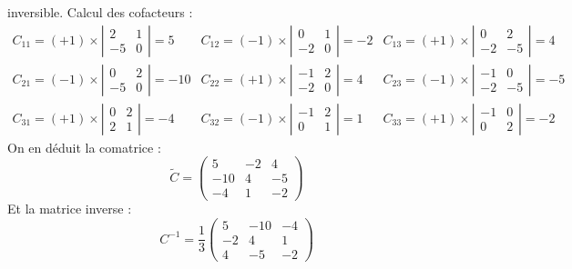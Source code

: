 {{inversible.
Calcul des cofacteurs :
$$
\begin{array}{lll}
	C_{11}=(+1) \times\left|\begin{array}{cc}
		2 & 1 \\
		-5 & 0
	\end{array}\right|=5 & C_{12}=(-1) \times\left|\begin{array}{cc}
		0 & 1 \\
		-2 & 0
	\end{array}\right|=-2 & C_{13}=(+1) \times\left|\begin{array}{cc}
		0 & 2 \\
		-2 & -5
	\end{array}\right|=4 \\
	C_{21}=(-1) \times\left|\begin{array}{cc}
		0 & 2 \\
		-5 & 0
	\end{array}\right|=-10 & C_{22}=(+1) \times\left|\begin{array}{cc}
		-1 & 2 \\
		-2 & 0
	\end{array}\right|=4 & C_{23}=(-1) \times\left|\begin{array}{cc}
		-1 & 0 \\
		-2 & -5
	\end{array}\right|=-5 \\
	C_{31}=(+1) \times\left|\begin{array}{cc}
		0 & 2 \\
		2 & 1
	\end{array}\right|=-4 & C_{32}=(-1) \times\left|\begin{array}{cc}
		-1 & 2 \\
		0 & 1
	\end{array}\right|=1 & C_{33}=(+1) \times\left|\begin{array}{cc}
		-1 & 0 \\
		0 & 2
	\end{array}\right|=-2
\end{array}
$$
On en déduit la comatrice :
$$
\tilde{C}=\left(\begin{array}{ccc}
	5 & -2 & 4 \\
	-10 & 4 & -5 \\
	-4 & 1 & -2
\end{array}\right)
$$
Et la matrice inverse :
$$
C^{-1}=\frac{1}{3}\left(\begin{array}{ccc}
	5 & -10 & -4 \\
	-2 & 4 & 1 \\
	4 & -5 & -2
\end{array}\right)
$$ }
}
